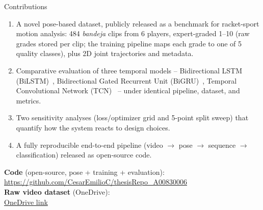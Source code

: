 \begin{frame}{Contributions}
\begin{enumerate}\small
    \item A novel \alert{pose-based dataset, publicly released as a benchmark} for racket-sport motion analysis: 484 \emph{bandeja} clips from 6 players, \alert{expert-graded 1--10} (raw grades stored per clip; the training pipeline maps each grade to one of 5 quality classes), plus 2D joint trajectories and metadata.
    \item Comparative evaluation of three temporal models -- \alert{Bidirectional LSTM (BiLSTM)~\cite{Hochreiter1997LSTM}, Bidirectional Gated Recurrent Unit (BiGRU)~\cite{Cho2014GRU}, Temporal Convolutional Network (TCN)~\cite{Lea2017TCN}} -- under identical pipeline, dataset, and metrics.
    \item Two sensitivity analyses (loss/optimizer grid and 5-point split sweep) that quantify how the system reacts to design choices.
    \item A fully \alert{reproducible end-to-end pipeline} (video $\rightarrow$ pose $\rightarrow$ sequence $\rightarrow$ classification) released as open-source code.
\end{enumerate}
\vspace{2pt}
\begin{infoBox}\scriptsize
\textbf{\color{tecdark}Code} (open-source, pose + training + evaluation):\\
\href{https://github.com/CesarEmilioC/thesisRepo_A00830006}{\color{tecblue}https://github.com/CesarEmilioC/thesisRepo\_A00830006}\\[2pt]
\textbf{\color{tecdark}Raw video dataset} (OneDrive):\\
\href{https://tecmx-my.sharepoint.com/:f:/g/personal/a00830006_tec_mx/IgDrzrId9pYeRJfgIrZXenPVAYbG_e8cPavR2xEUSQMTo8I?e=5Mb5hU}{\color{tecblue}OneDrive link}
\end{infoBox}
\end{frame}
